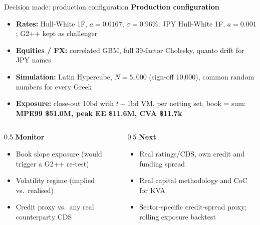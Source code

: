 \documentclass[8pt,aspectratio=169]{beamer}
\begin{document}
\begin{frame}{Decision made: production configuration}
  \small
  \textbf{Production configuration}
  \begin{itemize}
    \item \textbf{Rates:} Hull-White 1F, $a{=}0.0167$, $\sigma{=}0.96\%$; JPY Hull-White 1F, $a{=}0.001$; G2++ kept as challenger
    \item \textbf{Equities / FX:} correlated GBM, full 39-factor Cholesky, quanto drift for JPY names
    \item \textbf{Simulation:} Latin Hypercube, $N{=}5{,}000$ (sign-off 10,000), common random numbers for every Greek
    \item \textbf{Exposure:} close-out 10bd with $t{-}1$bd VM, per netting set, book = sum: \textbf{MPE99 \$51.0M, peak EE \$11.6M, CVA \$11.7k}
  \end{itemize}
  \vspace{10pt}
  \begin{columns}[T]
    \begin{column}{0.5\textwidth}
      \textbf{Monitor}
      \begin{itemize}
        \item Book slope exposure (would trigger a G2++ re-test)
        \item Volatility regime (implied vs.\ realised)
        \item Credit proxy vs.\ any real counterparty CDS
      \end{itemize}
    \end{column}
    \begin{column}{0.5\textwidth}
      \textbf{Next}
      \begin{itemize}
        \item Real ratings/CDS, own credit and funding spread
        \item Real capital methodology and CoC for KVA
        \item Sector-specific credit-spread proxy; rolling exposure backtest
      \end{itemize}
    \end{column}
  \end{columns}
\end{frame}
\end{document}
